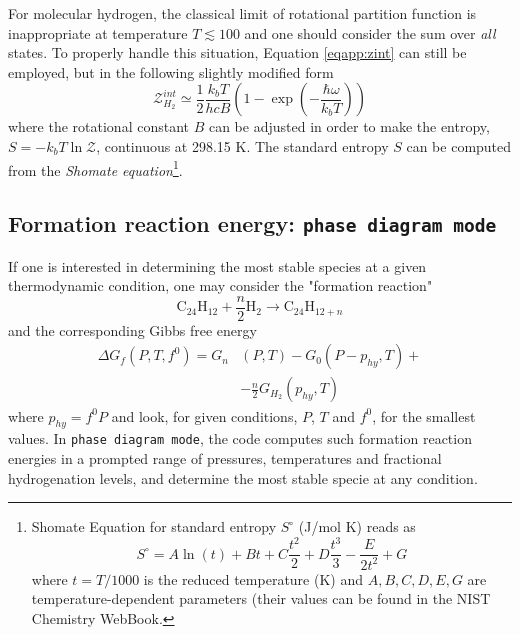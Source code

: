 \documentclass[a4paper, 11pt, twoside]{book}
\begin{document}
For molecular hydrogen, the classical limit of rotational partition function is inappropriate at temperature $T \lesssim 100$ and one should consider the sum over \emph{all} states. To properly handle this situation, Equation \eqref{eqapp:zint} can still be employed, but in the following slightly modified form
\begin{equation}
    \mathcal{Z}^{int}_{H_2} \simeq \frac{1}{2}\frac{k_bT}{hcB}\left(1-\exp\left(-\frac{\hbar\omega}{k_bT}\right)\right)
\end{equation}
where the rotational constant $B$ can be adjusted in order to make the entropy, $S=-k_bT\ln{\mathcal{Z}}$, continuous at 298.15 K. The standard entropy $S$ can be computed from the \emph{Shomate equation}\footnote{
Shomate Equation for standard entropy $S^{\circ}$ (J/mol K) reads as
\begin{equation*}
S^{\circ} = A \ln{(t)} + Bt + C\frac{t^2}{2} + D\frac{t^3}{3} - \frac{E}{2t^2} + G
\end{equation*}
where $t=T/1000$ is the reduced temperature (K) and $A,B,C,D,E,G$ are temperature-dependent parameters (their values can be found in the NIST Chemistry WebBook.}.

\subsection*{Formation reaction energy: \texttt{phase diagram mode}}
If one is interested in determining the most stable species at a given thermodynamic condition, one may consider the "formation reaction"
\begin{equation}
    \text{C}_{24}\text{H}_{12} + \frac{n}{2}\text{H}_{2} \rightarrow \text{C}_{24}\text{H}_{12+n} \nonumber
\end{equation}
and the corresponding Gibbs free energy 
\begin{align}
    \Delta G_f(P,T,f^0) = G_n&(P,T)-G_0(P-p_{hy},T)+ \nonumber \\
     &-\frac{n}{2}G_{H_2}(p_{hy},T) \nonumber 
\end{align}
where $p_{hy}=f^0P$ and look, for given conditions, $P$, $T$ and $f^0$, for the smallest values. In \texttt{phase diagram mode}, the code computes such formation reaction energies in a prompted range of pressures, temperatures and fractional hydrogenation levels, and determine the most stable specie at any condition. 
\end{document}
